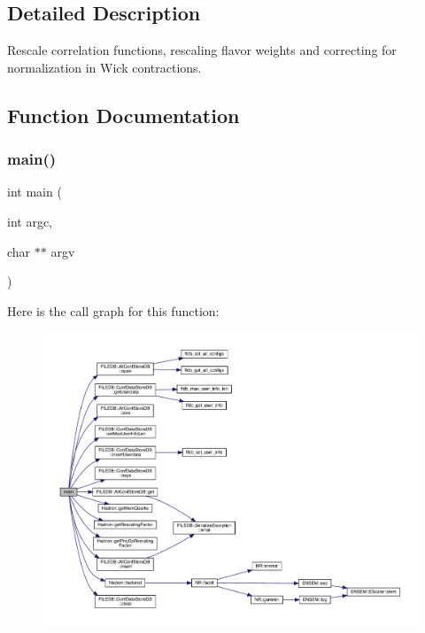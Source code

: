 \subsection{Detailed Description}
Rescale correlation functions, rescaling flavor weights and correcting for normalization in Wick contractions. 



\subsection{Function Documentation}
\mbox{\label{adat-devel_2main_2dbutil_2dbiso__wick__rescale_8cc_a3c04138a5bfe5d72780bb7e82a18e627}} 
\subsubsection{\texorpdfstring{main()}{main()}}
{\footnotesize\ttfamily int main (\begin{DoxyParamCaption}\item[{int}]{argc,  }\item[{char $\ast$$\ast$}]{argv }\end{DoxyParamCaption})}

Here is the call graph for this function\+:
\nopagebreak
\begin{figure}[H]
\begin{center}
\leavevmode
\includegraphics[width=350pt]{d8/d0c/adat-devel_2main_2dbutil_2dbiso__wick__rescale_8cc_a3c04138a5bfe5d72780bb7e82a18e627_cgraph}
\end{center}
\end{figure}
